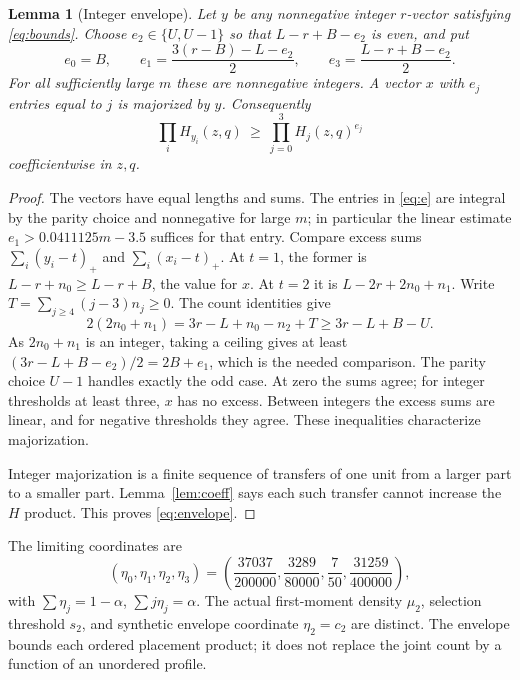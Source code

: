 \documentclass[11pt]{amsart}
\numberwithin{equation}{section}
\newtheorem{lemma}[theorem]{Lemma}
\theoremstyle{remark}\newtheorem{remark}[theorem]{Remark}
\begin{document}
\begin{lemma}[Integer envelope]\label{lem:envelope}
Let $y$ be any nonnegative integer $r$-vector satisfying \eqref{eq:bounds}. Choose $e_2\in\{U,U-1\}$ so that $L-r+B-e_2$ is even, and put
\begin{equation}\label{eq:e}
 e_0=B,\qquad e_1=\frac{3(r-B)-L-e_2}{2},\qquad
 e_3=\frac{L-r+B-e_2}{2}.
\end{equation}
For all sufficiently large $m$ these are nonnegative integers. A vector $x$ with $e_j$ entries equal to $j$ is majorized by $y$. Consequently
\begin{equation}\label{eq:envelope}
 \prod_i H_{y_i}(z,q)\ \geq\ \prod_{j=0}^3 H_j(z,q)^{e_j}
\end{equation}
coefficientwise in $z,q$.
\end{lemma}
\begin{proof}
The vectors have equal lengths and sums. The entries in \eqref{eq:e} are integral by the parity choice and nonnegative for large $m$; in particular the linear estimate $e_1>0.0411125m-3.5$ suffices for that entry. Compare excess sums $\sum_i(y_i-t)_+$ and $\sum_i(x_i-t)_+$. At $t=1$, the former is $L-r+n_0\geq L-r+B$, the value for $x$. At $t=2$ it is $L-2r+2n_0+n_1$. Write $T=\sum_{j\geq4}(j-3)n_j\geq0$. The count identities give
\[
 2(2n_0+n_1)=3r-L+n_0-n_2+T\geq3r-L+B-U.
\]
As $2n_0+n_1$ is an integer, taking a ceiling gives at least
$(3r-L+B-e_2)/2=2B+e_1$, which is the needed comparison. The parity choice $U-1$ handles exactly the odd case. At zero the sums agree; for integer thresholds at least three, $x$ has no excess. Between integers the excess sums are linear, and for negative thresholds they agree. These inequalities characterize majorization.

Integer majorization is a finite sequence of transfers of one unit from a larger part to a smaller part. Lemma~\ref{lem:coeff} says each such transfer cannot increase the $H$ product. This proves \eqref{eq:envelope}.
\end{proof}
The limiting coordinates are
\begin{equation}\label{eq:eta}
 (\eta_0,\eta_1,\eta_2,\eta_3)
 =\left(\frac{37037}{200000},\frac{3289}{80000},
             \frac7{50},\frac{31259}{400000}\right),
\end{equation}
with $\sum\eta_j=1-\alpha$, $\sum j\eta_j=\alpha$. The actual first-moment density $\mu_2$, selection threshold $s_2$, and synthetic envelope coordinate $\eta_2=c_2$ are distinct. The envelope bounds each ordered placement product; it does not replace the joint count by a function of an unordered profile.
\end{document}
